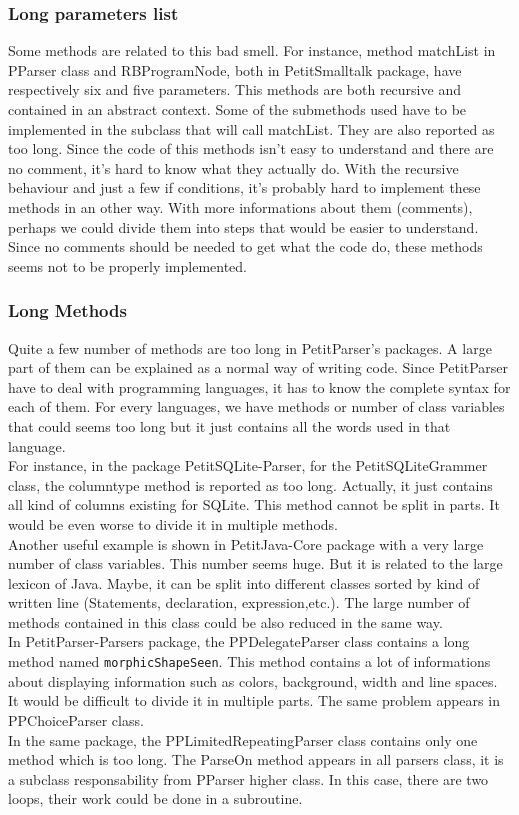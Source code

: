 \subsubsection{Long parameters list}
Some methods are related to this bad smell. For instance, method matchList in PParser class and RBProgramNode, both in PetitSmalltalk package, have respectively six and five parameters. This methods are both recursive and contained in an abstract context. Some of the submethods used have to be implemented in the subclass that will call matchList. They are also reported as too long. Since the code of this methods isn't easy to understand and there are no comment, it's hard to know what they actually do. With the recursive behaviour and just a few if conditions, it's probably hard to implement these methods in an other way. With more informations about them (comments), perhaps we could divide them into steps that would be easier to understand. Since no comments should be needed to get what the code do, these methods seems not to be properly implemented.\\




\subsubsection{Long Methods}
Quite a few number of methods are too long in PetitParser's packages. A large part of them can be explained as a normal way of writing code. Since PetitParser have to deal with programming languages, it has to know the complete syntax for each of them. For every languages, we have methods or number of class variables that could seems too long but it just contains all the words used in that language.\\
For instance, in the package PetitSQLite-Parser, for the PetitSQLiteGrammer class, the columntype method is reported as too long. Actually, it just contains all kind of columns existing for SQLite. This method cannot be split in parts. It would be even worse to divide it in multiple methods. \\
Another useful example is shown in PetitJava-Core package with a very large number of class variables. This number seems huge. But it is related to the large lexicon of Java. Maybe, it can be split into different classes sorted by kind of written line (Statements, declaration, expression,etc.). The large number of methods contained in this class could be also reduced in the same way. \\
In PetitParser-Parsers package, the PPDelegateParser class contains a long method named \texttt{morphicShapeSeen}. This method contains a lot of informations about displaying information such as colors, background, width and line spaces. It  would be difficult to divide it in multiple parts. The same problem appears in PPChoiceParser class.\\
In the same package, the PPLimitedRepeatingParser class contains only one method which is too long. The ParseOn method appears in all parsers class, it is a subclass responsability from PParser higher class. In this case, there are two loops, their work could be done in a subroutine.\\

